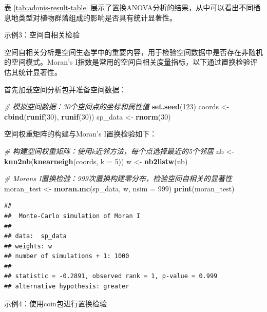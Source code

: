\documentclass[
  twoside,12pt,fontset=none]{ctexbook}
\newenvironment{Shaded}{\begin{snugshade}}{\end{snugshade}}
\newcommand{\AttributeTok}[1]{\textcolor[rgb]{0.13,0.29,0.53}{#1}}
\newcommand{\CommentTok}[1]{\textcolor[rgb]{0.56,0.35,0.01}{\textit{#1}}}
\newcommand{\DecValTok}[1]{\textcolor[rgb]{0.00,0.00,0.81}{#1}}
\newcommand{\FunctionTok}[1]{\textcolor[rgb]{0.13,0.29,0.53}{\textbf{#1}}}
\newcommand{\NormalTok}[1]{#1}
\newcommand{\OtherTok}[1]{\textcolor[rgb]{0.56,0.35,0.01}{#1}}
\begin{document}
表 \ref{tab:adonis-result-table} 展示了置换ANOVA分析的结果，从中可以看出不同栖息地类型对植物群落组成的影响是否具有统计显著性。

示例3：空间自相关检验

空间自相关分析是空间生态学中的重要内容，用于检验空间数据中是否存在非随机的空间模式。Moran's I指数是常用的空间自相关度量指标，以下通过置换检验评估其统计显著性。

首先加载空间分析包并准备空间数据：

\begin{Shaded}
\begin{Highlighting}[]
\CommentTok{\# 模拟空间数据：30个空间点的坐标和属性值}
\FunctionTok{set.seed}\NormalTok{(}\DecValTok{123}\NormalTok{)}
\NormalTok{coords }\OtherTok{\textless{}{-}} \FunctionTok{cbind}\NormalTok{(}\FunctionTok{runif}\NormalTok{(}\DecValTok{30}\NormalTok{), }\FunctionTok{runif}\NormalTok{(}\DecValTok{30}\NormalTok{))}
\NormalTok{sp\_data }\OtherTok{\textless{}{-}} \FunctionTok{rnorm}\NormalTok{(}\DecValTok{30}\NormalTok{)}
\end{Highlighting}
\end{Shaded}

空间权重矩阵的构建与Moran's I置换检验如下：

\begin{Shaded}
\begin{Highlighting}[]
\CommentTok{\# 构建空间权重矩阵：使用k近邻方法，每个点选择最近的5个邻居}
\NormalTok{nb }\OtherTok{\textless{}{-}} \FunctionTok{knn2nb}\NormalTok{(}\FunctionTok{knearneigh}\NormalTok{(coords, }\AttributeTok{k =} \DecValTok{5}\NormalTok{))}
\NormalTok{w }\OtherTok{\textless{}{-}} \FunctionTok{nb2listw}\NormalTok{(nb)}

\CommentTok{\# Moran\textquotesingle{}s I置换检验：999次置换构建零分布，检验空间自相关的显著性}
\NormalTok{moran\_test }\OtherTok{\textless{}{-}} \FunctionTok{moran.mc}\NormalTok{(sp\_data, w, }\AttributeTok{nsim =} \DecValTok{999}\NormalTok{)}
\FunctionTok{print}\NormalTok{(moran\_test)}
\end{Highlighting}
\end{Shaded}

\begin{verbatim}
## 
##  Monte-Carlo simulation of Moran I
## 
## data:  sp_data 
## weights: w  
## number of simulations + 1: 1000 
## 
## statistic = -0.2891, observed rank = 1, p-value = 0.999
## alternative hypothesis: greater
\end{verbatim}

示例4：使用coin包进行置换检验
\end{document}
